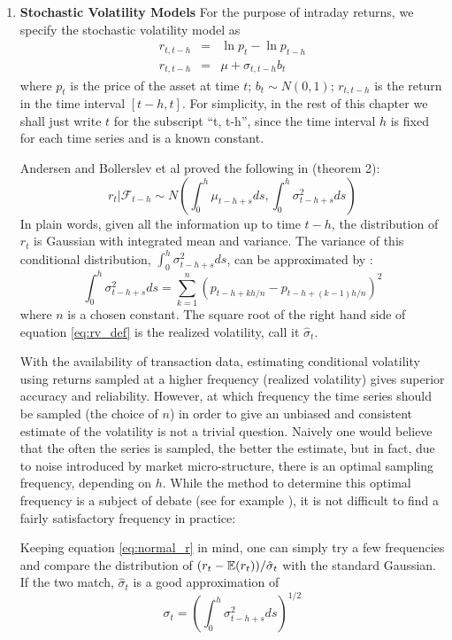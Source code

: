 \begin{enumerate}
\item {\bf Stochastic Volatility Models}\label{sec:SLV_model}
For the purpose of intraday returns, we specify the stochastic
volatility model as
\begin{eqnarray}
   r_{t, t-h} &=& \ln p_{t} - \ln p_{t-h} \nonumber \\
   r_{t, t-h} &=& \mu + \sigma_{t, t-h} b_t \label{eq:SLV_spec}
\end{eqnarray}
where $p_t$ is the price of the asset at time $t$; $b_t \sim N(0,
1)$; $r_{t, t-h}$ is the return in the time interval $[t-h, t]$.
For simplicity, in the rest of this chapter we shall just write
$t$ for the subscript ``t, t-h'', since the time interval $h$ is fixed
for each time series and is a known constant.

Andersen and Bollerslev et al proved the following in
\cite{Andersen03} (theorem 2):
\begin{equation}
  \label{eq:normal_r}
  r_t|\mathcal{F}_{t-h} \sim N(\int_{0}^h \mu_{t-h+s} ds, \int_{0}^h
  \sigma_{t-h+s}^2 ds)
\end{equation}
In plain words, given all the information up to time $t-h$, the
distribution of $r_t$ is Gaussian with integrated mean and variance.
The variance of this conditional distribution, $\int_{0}^h
\sigma_{t-h+s}^2 ds$, can be approximated by \cite{Protter05,
  Andersen03}:
\begin{equation}
  \label{eq:rv_def}
  \int_{0}^h \sigma_{t-h+s}^2 ds = \sum_{k=1}^n \left(
    p_{t-h+kh/n} - p_{t-h+(k-1)h/n} \right)^2
\end{equation}
where $n$ is a chosen constant. The square root of the right hand side
of equation \ref{eq:rv_def} is the realized volatility, call it
$\hat{\sigma}_t$.

With the availability of transaction data, estimating conditional
volatility using returns sampled at a higher frequency (realized
volatility) gives superior accuracy and reliability. However, at which
frequency the time series should be sampled (the choice of $n$) in
order to give an unbiased and consistent estimate of the volatility is
not a trivial question. Naively one would believe that the often the
series is sampled, the better the estimate, but in fact, due to noise
introduced by market micro-structure, there is an optimal sampling
frequency, depending on $h$. While the method to determine this
optimal frequency is a subject of debate (see for example
\cite{Sahalia05}), it is not difficult to find a fairly satisfactory
frequency in practice:

Keeping equation \ref{eq:normal_r} in mind, one can simply try a few
frequencies and compare the distribution of $(r_t -
\mathbb{E}(r_t))/\hat{\sigma}_t$ with the standard Gaussian. If the two match,
$\hat{\sigma}_t$ is a good approximation of
\[
\sigma_t = \left(\int_{0}^h \sigma_{t-h+s}^2 ds \right)^{1/2}
\]

\end{enumerate}

